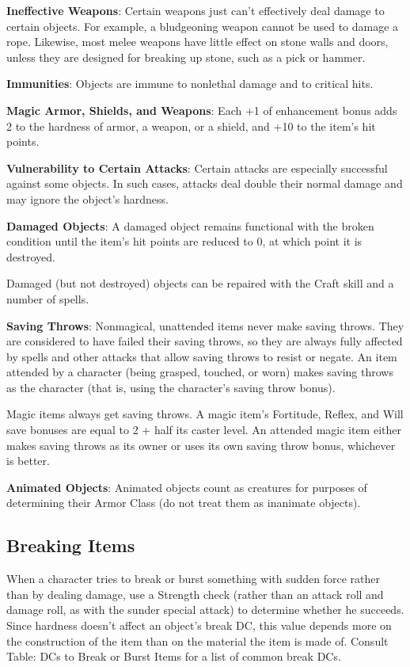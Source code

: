 \textbf{Ineffective Weapons}: Certain weapons just can't effectively deal damage to certain objects. For example, a bludgeoning weapon cannot be used to damage a rope. Likewise, most melee weapons have little effect on stone walls and doors, unless they are designed for breaking up stone, such as a pick or hammer.
			
\textbf{Immunities}: Objects are immune to nonlethal damage and to critical hits.
			
\textbf{Magic Armor, Shields, and Weapons}: Each +1 of enhancement bonus adds 2 to the hardness of armor, a weapon, or a shield, and +10 to the item's hit points.
			
\textbf{Vulnerability to Certain Attacks}: Certain attacks are especially successful against some objects. In such cases, attacks deal double their normal damage and may ignore the object's hardness.
			
\textbf{Damaged Objects}: A damaged object remains functional with the broken condition until the item's hit points are reduced to 0, at which point it is destroyed.
			
Damaged (but not destroyed) objects can be repaired with the Craft skill and a number of spells.
			
\textbf{Saving Throws}: Nonmagical, unattended items never make saving throws. They are considered to have failed their saving throws, so they are always fully affected by spells and other attacks that allow saving throws to resist or negate. An item attended by a character (being grasped, touched, or worn) makes saving throws as the character (that is, using the character's saving throw bonus).
			
Magic items always get saving throws. A magic item's Fortitude, Reflex, and Will save bonuses are equal to 2 + half its caster level. An attended magic item either makes saving throws as its owner or uses its own saving throw bonus, whichever is better.
			
\textbf{Animated Objects}: Animated objects count as creatures for purposes of determining their Armor Class (do not treat them as inanimate objects).
		
\subsection{Breaking Items}

			
When a character tries to break or burst something with sudden force rather than by dealing damage, use a Strength check (rather than an attack roll and damage roll, as with the sunder special attack) to determine whether he succeeds. Since hardness doesn't affect an object's break DC, this value depends more on the construction of the item than on the material the item is made of. Consult Table: DCs to Break or Burst Items for a list of common break DCs.
			
